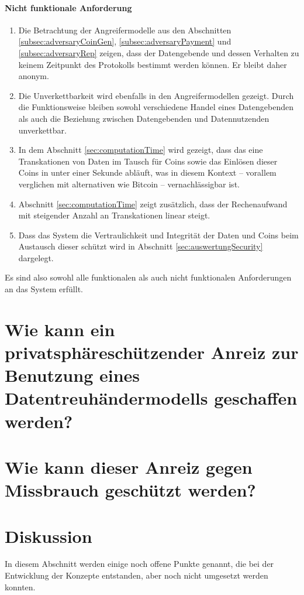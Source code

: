 \documentclass[
	fontsize=12pt,
	headings=small,
	parskip=half,           %
	bibliography=totoc,
	numbers=noenddot,       %
	open=any,               %
]{scrreprt}
\begin{document}
\paragraph{Nicht funktionale Anforderung}
\begin{enumerate}
    \item Die Betrachtung der Angreifermodelle aus den Abschnitten \ref{subsec:adversaryCoinGen}, \ref{subsec:adversaryPayment} und \ref{subsec:adversaryRep} zeigen, dass der Datengebende und dessen Verhalten zu keinem Zeitpunkt des Protokolls bestimmt werden können. Er bleibt daher anonym.
    \item Die Unverkettbarkeit wird ebenfalls in den Angreifermodellen gezeigt. Durch die Funktionsweise bleiben sowohl verschiedene Handel eines Datengebenden als auch die Beziehung zwischen Datengebenden und Datennutzenden unverkettbar.
    \item In dem Abschnitt \ref{sec:computationTime} wird gezeigt, dass das eine Transkationen von Daten im Tausch für Coins sowie das Einlösen dieser Coins in unter einer Sekunde abläuft, was in diesem Kontext -- vorallem verglichen mit alternativen wie Bitcoin -- vernachlässigbar ist.
    \item Abschnitt \ref{sec:computationTime} zeigt zusätzlich, dass der Rechenaufwand mit steigender Anzahl an Transkationen linear steigt.
    \item Dass das System die Vertraulichkeit und Integrität der Daten und Coins beim Austausch dieser schützt wird in Abschnitt \ref{sec:auswertungSecurity} dargelegt.
\end{enumerate}

Es sind also sowohl alle funktionalen als auch nicht funktionalen Anforderungen an das System erfüllt.

\section{Wie kann ein privatsphäreschützender Anreiz zur Benutzung eines Datentreuhändermodells geschaffen werden?}

\section{Wie kann dieser Anreiz gegen Missbrauch geschützt werden?}

\section{Diskussion}
\label{sec:discussion}
In diesem Abschnitt werden einige noch offene Punkte genannt, die bei der Entwicklung der Konzepte entstanden, aber noch nicht umgesetzt werden konnten. 
\end{document}
